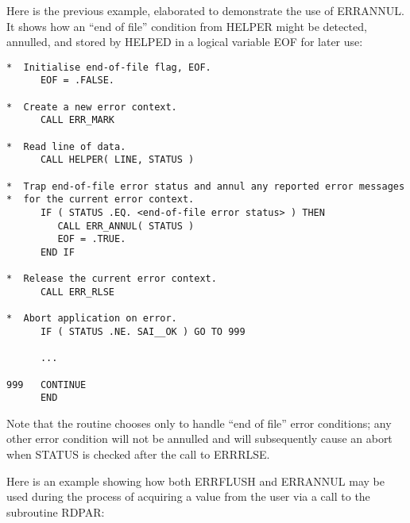 \documentclass[twoside,11pt]{article}
\renewcommand{\_}{\texttt{\symbol{95}}}
\begin{document}
Here is the previous example, elaborated to demonstrate the use of ERR\_ANNUL.
It shows how an ``end of file'' condition from HELPER might be detected, 
annulled, and stored by HELPED in a logical variable EOF for later use:

\begin {small}
\begin{verbatim}
*  Initialise end-of-file flag, EOF.
      EOF = .FALSE.

*  Create a new error context.
      CALL ERR_MARK

*  Read line of data.
      CALL HELPER( LINE, STATUS )

*  Trap end-of-file error status and annul any reported error messages
*  for the current error context.
      IF ( STATUS .EQ. <end-of-file error status> ) THEN
         CALL ERR_ANNUL( STATUS )
         EOF = .TRUE.
      END IF

*  Release the current error context.
      CALL ERR_RLSE

*  Abort application on error.
      IF ( STATUS .NE. SAI__OK ) GO TO 999

      ...

999   CONTINUE
      END
\end{verbatim}
\end {small}

Note that the routine chooses only to handle ``end of file'' error
conditions; any other error condition will not be annulled and will
subsequently cause an abort when STATUS is checked after the call to
ERR\_RLSE. 

Here is an example showing
how both ERR\_FLUSH and ERR\_ANNUL may be used during the process of
acquiring a value from the user via a call to the subroutine RDPAR: 
\end{document}
